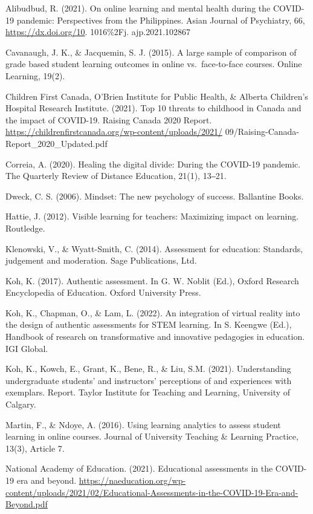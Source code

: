 \documentclass[
]{book}
\begin{document}
Alibudbud, R. (2021). On online learning and mental health during the COVID-19 pandemic: Perspectives from the Philippines. Asian Journal of Psychiatry, 66, \url{https://dx.doi.org/10}. 1016\%2Fj. ajp.2021.102867

Cavanaugh, J. K., \& Jacquemin, S. J. (2015). A large sample of comparison of grade based student learning outcomes in online vs.~face-to-face courses. Online Learning, 19(2).

Children First Canada, O'Brien Institute for Public Health, \& Alberta
Children's Hospital Research Institute. (2021). Top 10 threats to childhood in Canada and the impact of COVID-19. Raising Canada 2020 Report. \url{https://childrenfirstcanada.org/wp-content/uploads/2021/} 09/Raising-Canada-Report\_2020\_Updated.pdf

Correia, A. (2020). Healing the digital divide: During the COVID-19 pandemic. The Quarterly Review of Distance Education, 21(1), 13‒21.

Dweck, C. S. (2006). Mindset: The new psychology of success. Ballantine Books.

Hattie, J. (2012). Visible learning for teachers: Maximizing impact on learning. Routledge.

Klenowski, V., \& Wyatt-Smith, C. (2014). Assessment for education: Standards, judgement and moderation. Sage Publications, Ltd.

Koh, K. (2017). Authentic assessment. In G. W. Noblit (Ed.), Oxford Research Encyclopedia of Education. Oxford University Press.

Koh, K., Chapman, O., \& Lam, L. (2022). An integration of virtual reality into the design of authentic assessments for STEM learning. In S. Keengwe (Ed.), Handbook of research on transformative and innovative pedagogies in education. IGI Global.

Koh, K., Kowch, E., Grant, K., Bene, R., \& Liu, S.M. (2021). Understanding undergraduate students' and instructors' perceptions of and experiences with exemplars. Report. Taylor Institute for Teaching and Learning, University of Calgary.

Martin, F., \& Ndoye, A. (2016). Using learning analytics to assess student learning in online courses. Journal of University Teaching \& Learning Practice, 13(3), Article 7.

National Academy of Education. (2021). Educational assessments in the COVID-19 era and beyond. \url{https://naeducation.org/wp-content/uploads/2021/02/Educational-Assessments-in-the-COVID-19-Era-and-Beyond.pdf}
\end{document}
